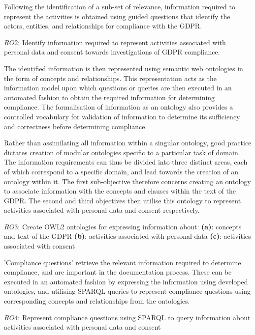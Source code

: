 Following the identification of a sub-set of relevance, information required to represent the activities is obtained using guided questions that identify the actors, entities, and relationships for compliance with the GDPR.
\begin{framed}
$RO2$: Identify information required to represent activities associated with personal data and consent towards investigations of GDPR compliance.
\end{framed}

The identified information is then represented using semantic web ontologies in the form of concepts and relationships. This representation acts as the information model upon which questions or queries are then  executed in an automated fashion to obtain the required information for determining compliance. The formalisation of information as an ontology also provides a controlled vocabulary for validation of information to determine its sufficiency and correctness before determining compliance. 

Rather than assimilating all information within a singular ontology, good practice dictates creation of modular ontologies specific to a particular task of domain. The information requirements can thus be divided into three distinct areas, each of which correspond to a specific domain, and lead towards the creation of an ontology within it. The first sub-objective therefore concerns creating an ontology to associate information with the concepts and clauses within the text of the GDPR. The second and third objectives then utilise this ontology to represent activities associated with personal data and consent respectively.
\begin{framed}
$RO3$: Create OWL2 ontologies for expressing information about:
\newline\indent\indent\textbf{(a)}: concepts and text of the GDPR
\newline\indent\indent\textbf{(b)}: activities associated with personal data
\newline\indent\indent\textbf{(c)}: activities associated with consent
\end{framed}

'Compliance questions' retrieve the relevant information required to determine compliance, and are important in the documentation process. These can be executed in an automated fashion by expressing the information using developed ontologies, and utilising SPARQL queries to represent compliance questions using corresponding concepts and relationships from the ontologies.
\begin{framed}
$RO4$: Represent compliance questions using SPARQL to query information about activities associated with personal data and consent
\end{framed}

